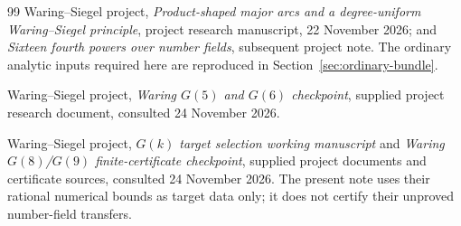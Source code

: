 \documentclass[11pt,reqno]{amsart}
\numberwithin{equation}{section}
\theoremstyle{definition}
\begin{document}
\begin{thebibliography}{99}
Waring--Siegel project, \emph{Product-shaped major arcs and a degree-uniform
Waring--Siegel principle}, project research manuscript, 22 November 2026;
and \emph{Sixteen fourth powers over number fields}, subsequent project note.
The ordinary analytic inputs required here are reproduced in
Section~\ref{sec:ordinary-bundle}.

Waring--Siegel project, \emph{Waring $G(5)$ and $G(6)$ checkpoint},
supplied project research document, consulted 24 November 2026.

Waring--Siegel project, \emph{$G(k)$ target selection working manuscript}
and \emph{Waring $G(8)$/$G(9)$ finite-certificate checkpoint},
supplied project documents and certificate sources, consulted 24 November 2026.
The present note uses their rational numerical bounds as target data only;
it does not certify their unproved number-field transfers.
\end{thebibliography}
\end{document}
